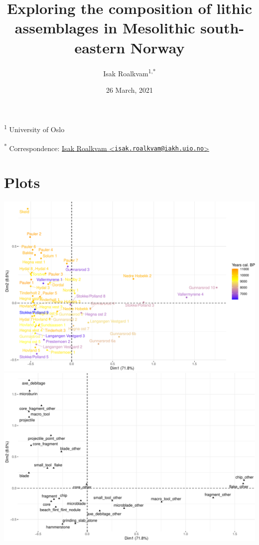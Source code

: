 \documentclass[
]{article}
\title{Exploring the composition of lithic assemblages in Mesolithic south-eastern Norway}
\author{Isak Roalkvam\textsuperscript{1,*}}
\date{26 March, 2021}
\begin{document}
\maketitle

{
\setcounter{tocdepth}{2}
\tableofcontents
}
\textsuperscript{1} University of Oslo

\textsuperscript{*} Correspondence: \href{mailto:isak.roalkvam@iakh.uio.no}{Isak Roalkvam \textless{}\href{mailto:isak.roalkvam@iakh.uio.no}{\nolinkurl{isak.roalkvam@iakh.uio.no}}\textgreater{}}

\hypertarget{plots}{%
\section{Plots}\label{plots}}

\includegraphics{../figures/cor-1.pdf} \includegraphics{../figures/cor-2.pdf}
\end{document}
